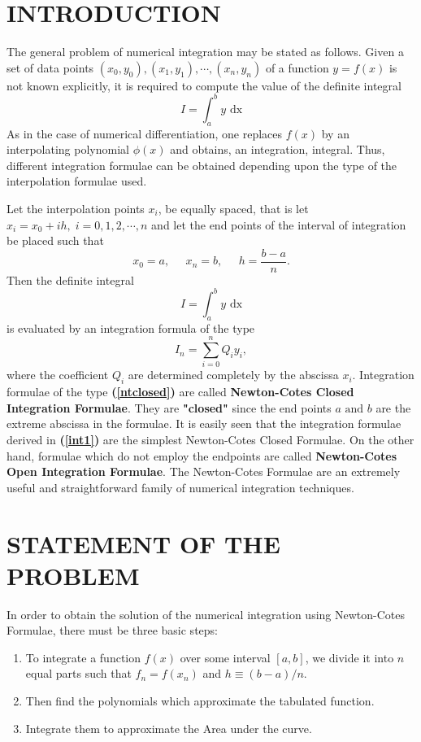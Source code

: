\documentclass[12pt]{report}
\newcommand{\sps}{\\[0.2cm]}
\newcommand{\refn}[1]{\textbf{(\ref{#1})}}
\newcommand{\bt}[1]{\textbf{#1}}
\newcommand{\NCF}{Newton-Cotes Formulae}
\begin{document}
	\section{INTRODUCTION}
	The general problem of numerical integration may be stated as follows. Given a set of data points $(x_0, y_0), (x_1,y_1), \cdots , (x_n,y_n)$ of a function $\displaystyle y = f(x)$ is not known explicitly, it is required to compute the value of the definite integral
	\begin{equation}
		I = \int_a^b y\text{ dx}
	\end{equation}
	As in the case of numerical differentiation, one replaces $f(x)$ by an interpolating polynomial $\phi (x)$ and obtains, an integration, integral. Thus, different integration formulae can be obtained depending upon the type of the interpolation formulae used.\sps
	\par Let the interpolation points $x_i$, be equally spaced, that is let $x_i = x_0 + ih, \; i = 0, 1, 2, \cdots , n$ and let the end points of the interval of integration be placed such that
	$$
	x_0 = a, \; \; \; \; \; x_n = b, \; \; \; \; \; h = \frac{b-a}{n} .
	$$
	Then the definite integral
	\begin{equation}
		I = \int_{a}^{b}y\text{ dx}
		\label{int1}
	\end{equation}
	is evaluated by an integration formula of the type
	\begin{equation}
		I_n = \sum_{i=0}^{n} Q_i y_i ,
		\label{ntclosed}
	\end{equation}
	where the coefficient $Q_i$ are determined completely by the abscissa $x_i$. Integration formulae of the type \refn{ntclosed} are called \textbf{Newton-Cotes Closed Integration Formulae}. They are \textbf{"closed"} since the end points $a \text{ and } b$ are the extreme abscissa in the formulae. It is easily seen that the integration formulae derived in \refn{int1} are the simplest Newton-Cotes Closed Formulae. On the other hand, formulae which do not employ the endpoints are called \bt{Newton-Cotes Open Integration Formulae}. The Newton-Cotes Formulae are an extremely useful and straightforward family of numerical integration techniques.
	
	\section{STATEMENT OF THE PROBLEM}
	In order to obtain the solution of the numerical integration using \NCF, there must be three basic steps:
	\begin{enumerate}
		\item To integrate a function $f(x)$ over some interval $[a,b]$, we divide it into $n$ equal parts such that $f_n = f(x_n)$ and $h\equiv (b-a)/n$.
		
		\item Then find the polynomials which approximate the tabulated function.
		
		\item Integrate them to approximate the Area under the curve.
	\end{enumerate}
	
\end{document}
